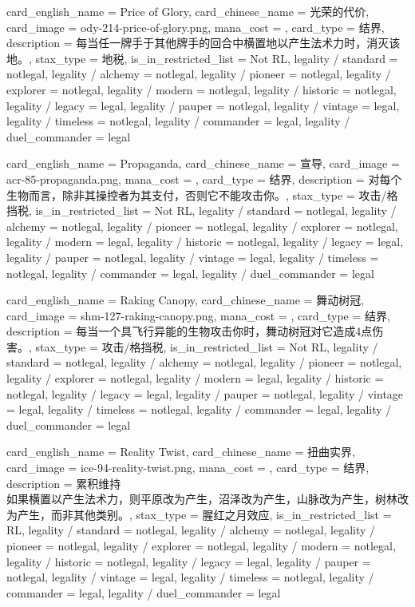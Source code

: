 \documentclass[lang = cn, color = black, 10pt]{AllThatStax}
\begin{document}
\card
{
	card_english_name = {Price of Glory},
	card_chinese_name = {光荣的代价},
	card_image = ody-214-price-of-glory.png,
	mana_cost = ,
	card_type = 结界,
	description = {每当任一牌手于其他牌手的回合中横置地以产生法术力时，消灭该地。},
	stax_type = 地税,
	is_in_restricted_list = Not RL,
	legality / standard = notlegal,
	legality / alchemy = notlegal,
	legality / pioneer = notlegal,
	legality / explorer = notlegal,
	legality / modern = notlegal,
	legality / historic = notlegal,
	legality / legacy = legal,
	legality / pauper = notlegal,
	legality / vintage = legal,
	legality / timeless = notlegal,
	legality / commander = legal,
	legality / duel_commander = legal
}

\card
{
	card_english_name = {Propaganda},
	card_chinese_name = {宣导},
	card_image = acr-85-propaganda.png,
	mana_cost = ,
	card_type = 结界,
	description = {对每个生物而言，除非其操控者为其支付，否则它不能攻击你。},
	stax_type = 攻击/格挡税,
	is_in_restricted_list = Not RL,
	legality / standard = notlegal,
	legality / alchemy = notlegal,
	legality / pioneer = notlegal,
	legality / explorer = notlegal,
	legality / modern = legal,
	legality / historic = notlegal,
	legality / legacy = legal,
	legality / pauper = notlegal,
	legality / vintage = legal,
	legality / timeless = notlegal,
	legality / commander = legal,
	legality / duel_commander = legal
}

\card
{
	card_english_name = {Raking Canopy},
	card_chinese_name = {舞动树冠},
	card_image = shm-127-raking-canopy.png,
	mana_cost = ,
	card_type = 结界,
	description = {每当一个具飞行异能的生物攻击你时，舞动树冠对它造成4点伤害。},
	stax_type = 攻击/格挡税,
	is_in_restricted_list = Not RL,
	legality / standard = notlegal,
	legality / alchemy = notlegal,
	legality / pioneer = notlegal,
	legality / explorer = notlegal,
	legality / modern = legal,
	legality / historic = notlegal,
	legality / legacy = legal,
	legality / pauper = notlegal,
	legality / vintage = legal,
	legality / timeless = notlegal,
	legality / commander = legal,
	legality / duel_commander = legal
}

\card
{
	card_english_name = {Reality Twist},
	card_chinese_name = {扭曲实界},
	card_image = ice-94-reality-twist.png,
	mana_cost = ,
	card_type = 结界,
	description = {累积维持\\
如果横置以产生法术力，则平原改为产生，沼泽改为产生，山脉改为产生，树林改为产生，而非其他类别。},
	stax_type = 腥红之月效应,
	is_in_restricted_list = RL,
	legality / standard = notlegal,
	legality / alchemy = notlegal,
	legality / pioneer = notlegal,
	legality / explorer = notlegal,
	legality / modern = notlegal,
	legality / historic = notlegal,
	legality / legacy = legal,
	legality / pauper = notlegal,
	legality / vintage = legal,
	legality / timeless = notlegal,
	legality / commander = legal,
	legality / duel_commander = legal
}
\end{document}
